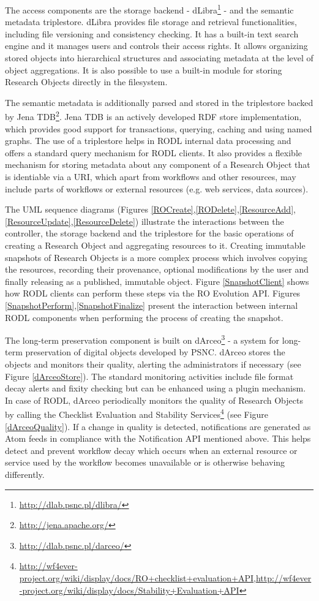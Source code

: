 The access components are the storage backend - dLibra\footnote{\url{http://dlab.psnc.pl/dlibra/}} - and the semantic metadata triplestore. dLibra provides file storage and retrieval functionalities, including file versioning and consistency checking. It has a built-in text search engine and it manages users and controls their access rights. It allows organizing stored objects into hierarchical structures and associating metadata at the level of object aggregations. It is also possible to use a built-in module for storing Research Objects directly in the filesystem.

The semantic metadata is additionally parsed and stored in the triplestore backed by Jena TDB\footnote{\url{http://jena.apache.org/}}. Jena TDB is an actively developed RDF store implementation, which provides good support for transactions, querying, caching and using named graphs. The use of a triplestore helps in RODL internal data processing and offers a standard query mechanism for RODL clients. It also provides a flexible mechanism for storing metadata about any component of a Research Object that is identiable via a URI, which apart from workflows and other resources, may include parts of workflows or external resources (e.g. web services, data sources).

The UML sequence diagrams (Figures \ref{ROCreate},\ref{RODelete},\ref{ResourceAdd},\ref{ResourceUpdate},\ref{ResourceDelete}) illustrate the interactions between the controller, the storage backend and the triplestore for the basic operations of creating a Research Object and aggregating resources to it. Creating immutable snapshots of Research Objects is a more complex process which involves copying the resources, recording their provenance, optional modifications by the user and finally releasing as a published, immutable object. Figure \ref{SnapshotClient} shows how RODL clients can perform these steps via the RO Evolution API. Figures \ref{SnapshotPerform},\ref{SnapshotFinalize} present the interaction between internal RODL components when performing the process of creating the snapshot.

The long-term preservation component is built on dArceo\footnote{\url{http://dlab.psnc.pl/darceo/}} - a system for long-term preservation of digital objects developed by PSNC. dArceo stores the objects and monitors their quality, alerting the administrators if necessary (see Figure \ref{dArceoStore}). The standard monitoring activities include file format decay alerts and fixity checking but can be enhanced using a plugin mechanism. In case of RODL, dArceo periodically monitors the quality of Research Objects by calling the Checklist Evaluation and Stability Services\footnote{\url{http://wf4ever-project.org/wiki/display/docs/RO+checklist+evaluation+API},\url{http://wf4ever-project.org/wiki/display/docs/Stability+Evaluation+API}}  (see Figure \ref{dArceoQuality}). If a change in quality is detected, notifications are generated as Atom feeds in compliance with the Notification API mentioned above. This helps detect and prevent workflow decay which occurs when an external resource or service used by the workflow becomes unavailable or is otherwise behaving differently.

